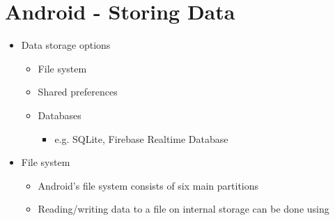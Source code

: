 \documentclass[11pt]{article}
\begin{document}
\newpage
\section{Android - Storing Data}
\begin{itemize}
	\item Data storage options
		\begin{itemize}
			\item File system
			\item Shared preferences
			\item Databases
				\begin{itemize}
					\item e.g. SQLite, Firebase Realtime Database
				\end{itemize}
		\end{itemize}

	\item File system
		\begin{itemize}
			\item Android’s file system consists of six main partitions
			\item Reading/writing data to a file on internal storage can be done using
		\end{itemize}


\end{itemize}
\end{document}
